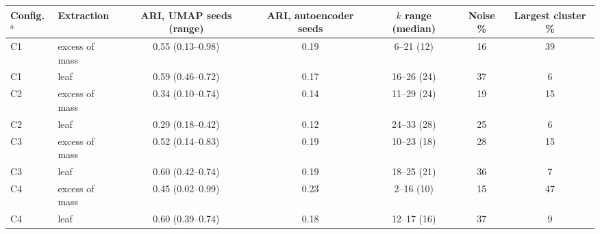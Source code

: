 \begin{tabular}{llccccc}\toprule
Config.$^a$ & Extraction & ARI, UMAP seeds (range) & ARI, autoencoder seeds & $k$ range (median) & Noise \% & Largest cluster \% \\ \midrule
C1 & excess of mass & 0.55 (0.13--0.98) & 0.19 & 6--21 (12) & 16 & 39 \\
C1 & leaf & 0.59 (0.46--0.72) & 0.17 & 16--26 (24) & 37 & 6 \\
C2 & excess of mass & 0.34 (0.10--0.74) & 0.14 & 11--29 (24) & 19 & 15 \\
C2 & leaf & 0.29 (0.18--0.42) & 0.12 & 24--33 (28) & 25 & 6 \\
C3 & excess of mass & 0.52 (0.14--0.83) & 0.19 & 10--23 (18) & 28 & 15 \\
C3 & leaf & 0.60 (0.42--0.74) & 0.19 & 18--25 (21) & 36 & 7 \\
C4 & excess of mass & 0.45 (0.02--0.99) & 0.23 & 2--16 (10) & 15 & 47 \\
C4 & leaf & 0.60 (0.39--0.74) & 0.18 & 12--17 (16) & 37 & 9 \\
\bottomrule\end{tabular}